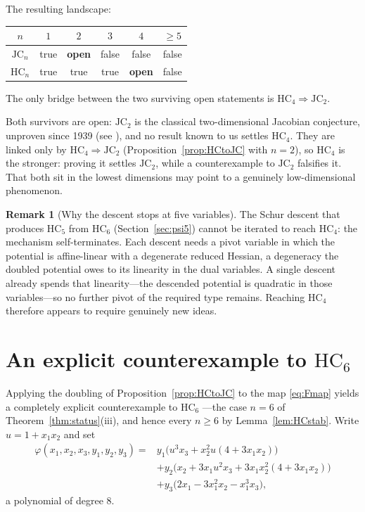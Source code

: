 \documentclass[11pt]{article}
\theoremstyle{plain}
\theoremstyle{definition}
\newtheorem{remark}[theorem]{Remark}
\newcommand{\JC}{\mathrm{JC}}
\newcommand{\HC}{\mathrm{HC}}
\begin{document}
\medskip
\noindent
The resulting landscape:

\begin{center}
\renewcommand{\arraystretch}{1.3}
\begin{tabular}{c|ccccc}
$n$ & $1$ & $2$ & $3$ & $4$ & $\ge5$\\
\hline
$\JC_n$ & true & \textbf{open} & false & false & false\\
$\HC_n$ & true & true & true & \textbf{open} & false\\
\end{tabular}

\smallskip
{\small The only bridge between the two surviving open statements is
$\HC_4\Rightarrow\JC_2$.}
\end{center}

\noindent
Both survivors are open: $\JC_2$ is the classical two-dimensional
Jacobian conjecture, unproven since 1939 (see \cite{vandenEssen2000}),
and no result known to us settles $\HC_4$. They are linked only by
$\HC_4\Rightarrow\JC_2$ (Proposition~\ref{prop:HCtoJC} with $n=2$), so
$\HC_4$ is the stronger: proving it settles $\JC_2$, while a
counterexample to $\JC_2$ falsifies it. That both sit in the lowest
dimensions may point to a genuinely low-dimensional phenomenon.

\begin{remark}[Why the descent stops at five variables]
\label{rem:selfterm}
The Schur descent that produces $\HC_5$ from $\HC_6$
(Section~\ref{sec:psi5}) cannot be iterated to reach $\HC_4$: the
mechanism self-terminates. Each descent needs a pivot variable in which
the potential is affine-linear with a degenerate reduced Hessian, a
degeneracy the doubled potential owes to its linearity in the dual
variables. A single descent already spends that linearity---the
descended potential is quadratic in those variables---so no further
pivot of the required type remains. Reaching $\HC_4$ therefore appears
to require genuinely new ideas.
\end{remark}

\section{An explicit counterexample to \texorpdfstring{$\HC_6$}{HC6}}

Applying the doubling of Proposition~\ref{prop:HCtoJC} to the map
\eqref{eq:Fmap} yields a completely explicit counterexample to $\HC_6$
---the case $n=6$ of Theorem~\ref{thm:status}(iii), and hence every
$n\ge6$ by Lemma~\ref{lem:HCstab}. Write $u=1+x_1x_2$ and set
\begin{equation}\label{eq:phi}
\begin{aligned}
\varphi(x_1,x_2,x_3,y_1,y_2,y_3)
={}& y_1\bigl(u^3x_3+x_2^2u(4+3x_1x_2)\bigr)\\
&+ y_2\bigl(x_2+3x_1u^2x_3+3x_1x_2^2(4+3x_1x_2)\bigr)\\
&+ y_3\bigl(2x_1-3x_1^2x_2-x_1^3x_3\bigr),
\end{aligned}
\end{equation}
a polynomial of degree $8$.
\end{document}
